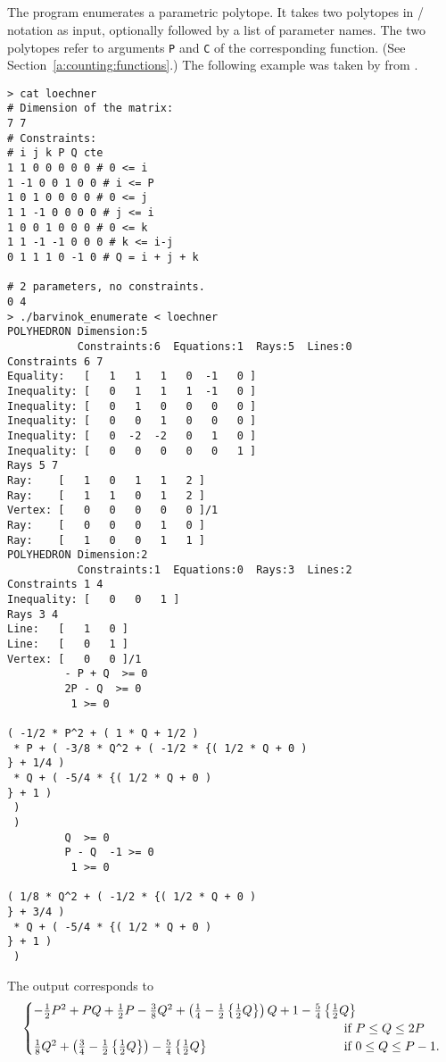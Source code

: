 \subsection{\texorpdfstring{\protect{}}
{barvinok\_enumerate}}

The program  enumerates a
parametric polytope.  It takes two polytopes in \PolyLib/
notation as input, optionally followed by a list of parameter
names.
The two polytopes refer to arguments \verb+P+ and \verb+C+
of the corresponding function. (See Section~\ref{a:counting:functions}.)
The following example was taken by 
from .
\begin{verbatim}
> cat loechner 
# Dimension of the matrix: 
7 7 
# Constraints: 
# i j k P Q cte 
1 1 0 0 0 0 0 # 0 <= i 
1 -1 0 0 1 0 0 # i <= P 
1 0 1 0 0 0 0 # 0 <= j 
1 1 -1 0 0 0 0 # j <= i
1 0 0 1 0 0 0 # 0 <= k 
1 1 -1 -1 0 0 0 # k <= i-j 
0 1 1 1 0 -1 0 # Q = i + j + k

# 2 parameters, no constraints. 
0 4
> ./barvinok_enumerate < loechner 
POLYHEDRON Dimension:5
           Constraints:6  Equations:1  Rays:5  Lines:0
Constraints 6 7
Equality:   [   1   1   1   0  -1   0 ]
Inequality: [   0   1   1   1  -1   0 ]
Inequality: [   0   1   0   0   0   0 ]
Inequality: [   0   0   1   0   0   0 ]
Inequality: [   0  -2  -2   0   1   0 ]
Inequality: [   0   0   0   0   0   1 ]
Rays 5 7
Ray:    [   1   0   1   1   2 ]
Ray:    [   1   1   0   1   2 ]
Vertex: [   0   0   0   0   0 ]/1
Ray:    [   0   0   0   1   0 ]
Ray:    [   1   0   0   1   1 ]
POLYHEDRON Dimension:2
           Constraints:1  Equations:0  Rays:3  Lines:2
Constraints 1 4
Inequality: [   0   0   1 ]
Rays 3 4
Line:   [   1   0 ]
Line:   [   0   1 ]
Vertex: [   0   0 ]/1
         - P + Q  >= 0
         2P - Q  >= 0
          1 >= 0

( -1/2 * P^2 + ( 1 * Q + 1/2 )
 * P + ( -3/8 * Q^2 + ( -1/2 * {( 1/2 * Q + 0 )
} + 1/4 )
 * Q + ( -5/4 * {( 1/2 * Q + 0 )
} + 1 )
 )
 )
         Q  >= 0
         P - Q  -1 >= 0
          1 >= 0

( 1/8 * Q^2 + ( -1/2 * {( 1/2 * Q + 0 )
} + 3/4 )
 * Q + ( -5/4 * {( 1/2 * Q + 0 )
} + 1 )
 )
\end{verbatim}
The output corresponds to 
$$
\begin{cases}
\makebox[0pt][l]{$-\frac 1 2 P^2 + P Q + \frac 1 2 P - \frac 3 8 Q^2
+ \left( \frac 1 4 - \frac 1 2 \left\{ \frac 1 2 Q \right\} \right)
	       	Q + 1 
- \frac 5 4 \left\{ \frac 1 2 Q \right\}$} \\
&
\hbox{if $P \le Q \le 2 P$}
\\
\frac 1 8 Q^2 + 
\left( \frac 3 4 - \frac 1 2 \left\{ \frac 1 2 Q \right\} \right)
- \frac 5 4 \left\{ \frac 1 2 Q \right\}
\qquad
\qquad
\qquad
\qquad
\qquad
&
\hbox{if $0 \le Q \le P-1$}
.
\end{cases}
$$

